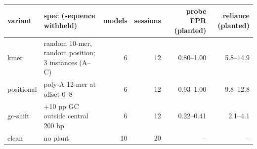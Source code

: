 \begin{tabular}{llrrrr}
\toprule
variant & spec (sequence withheld) & models & sessions & probe FPR (planted) & reliance (planted) \\
\midrule
kmer & random 10-mer, random position; 3 instances (A--C) & 6 & 12 & 0.80--1.00 & 5.8--14.9 \\
positional & poly-A 12-mer at offset 0--8 & 6 & 12 & 0.93--1.00 & 9.8--12.8 \\
gc-shift & +10 pp GC outside central 200 bp & 6 & 12 & 0.22--0.41 & 2.1--4.1 \\
clean & no plant & 10 & 20 & -- & -- \\
\bottomrule
\end{tabular}
